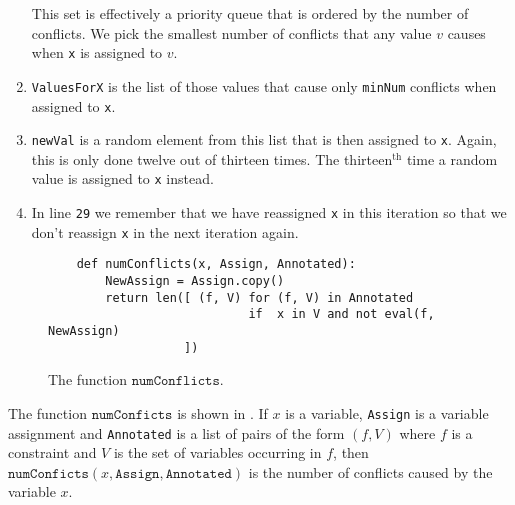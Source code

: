 \begin{enumerate}
      This set is effectively a priority queue that is ordered by the number of conflicts.  We pick the
      smallest number of conflicts that any value $v$ causes when \texttt{x} is assigned to $v$.
\item \texttt{ValuesForX} is the list of those values that cause only \texttt{minNum} conflicts when assigned
      to \texttt{x}. 
\item \texttt{newVal} is a random element from this list that is then assigned to \texttt{x}.
      Again, this is only done twelve out of thirteen times.  The thirteen$^\mathrm{th}$ time a random value is
      assigned to \texttt{x} instead. 
\item In line \texttt{29} we remember that we have reassigned \texttt{x} in this iteration so that we don't reassign
      \texttt{x} in the next iteration again.
\end{enumerate}

\begin{figure}[!ht]
\centering
\begin{verbatim}
    def numConflicts(x, Assign, Annotated):
        NewAssign = Assign.copy()
        return len([ (f, V) for (f, V) in Annotated 
                            if  x in V and not eval(f, NewAssign) 
                   ])
\end{verbatim}
\vspace*{-0.3cm}
\caption{The function $\texttt{numConflicts}$.}
\label{fig:Local-Search.ipynb:numConflicts}
\end{figure}

The function $\texttt{numConficts}$ is shown in .  If $x$ is a variable,
\texttt{Assign} is a variable assignment and \texttt{Annotated} is a list of pairs of the form $(f, V)$ where
$f$ is a constraint and $V$ is the set of variables occurring in $f$, then 
$\texttt{numConficts}(x,\texttt{Assign}, \texttt{Annotated})$
is the number of conflicts caused by the variable $x$.


